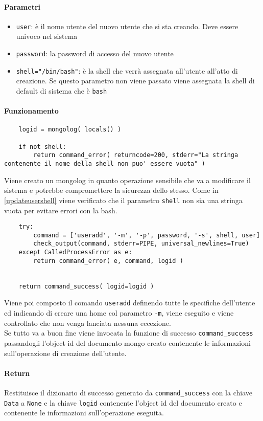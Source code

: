 \documentclass[11pt]{article}
\begin{document}
\paragraph{Parametri}
\begin{itemize}
	\item{\texttt{user}: è il nome utente del nuovo utente che si sta creando. Deve essere univoco nel sistema}
	\item{\texttt{password}: la password di accesso del nuovo utente}
	\item{\texttt{shell="/bin/bash"}: è la shell che verrà assegnata all'utente all'atto di creazione.
		Se questo parametro non viene passato viene assegnata la shell di default di sistema che è \texttt{bash}}
\end{itemize}
\paragraph{Funzionamento}
\begin{lstlisting}
    logid = mongolog( locals() )
    
    if not shell:
    	return command_error( returncode=200, stderr="La stringa contenente il nome della shell non puo' essere vuota" )
\end{lstlisting}
Viene creato un mongolog in quanto operazione sensibile che va a modificare il sistema e potrebbe compromettere
la sicurezza dello stesso. Come in \ref{updateusershell} viene verificato che il parametro \texttt{shell} non sia
una stringa vuota per evitare errori con la bash.
\begin{lstlisting}
    try:
        command = ['useradd', '-m', '-p', password, '-s', shell, user]
        check_output(command, stderr=PIPE, universal_newlines=True)
    except CalledProcessError as e:
        return command_error( e, command, logid )
    

    return command_success( logid=logid )
\end{lstlisting}
Viene poi composto il comando \texttt{useradd} definendo tutte le specifiche dell'utente ed indicando di creare
una home col parametro \texttt{-m}, viene eseguito e viene controllato che non venga lanciata nessuna eccezione.\\
Se tutto va a buon fine viene invocata la funzione di successo \texttt{command\_success} passandogli l'object id
del documento mongo creato contenente le informazioni sull'operazione di creazione dell'utente.
\paragraph{Return}
Restituisce il dizionario di successo generato da \texttt{command\_success} con la chiave \texttt{Data} a \texttt{None}
e la chiave \texttt{logid} contenente l'object id del documento creato e contenente le informazioni sull'operazione
eseguita.
\end{document}
